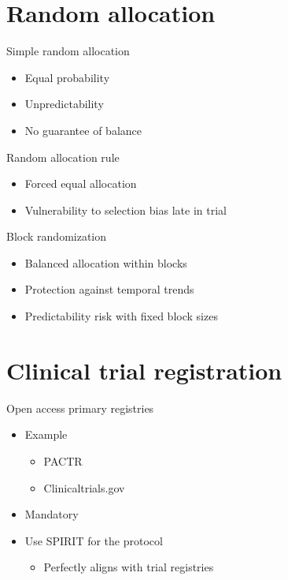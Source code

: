 \documentclass[
  14pt,
  ignorenonframetext,
  aspectratio=169,
]{beamer}
\providecommand{\tightlist}{%
  \setlength{\itemsep}{0pt}\setlength{\parskip}{0pt}}
\begin{document}
\section{Random allocation}\label{random-allocation}

\begin{frame}{Simple random allocation}
\protect{}\label{simple-random-allocation}
\begin{itemize}
\item
  Equal probability
\item
  Unpredictability
\item
  No guarantee of balance
\end{itemize}
\end{frame}

\begin{frame}{Random allocation rule}
\protect{}\label{random-allocation-rule}
\begin{itemize}
\item
  Forced equal allocation
\item
  Vulnerability to selection bias late in trial
\end{itemize}
\end{frame}

\begin{frame}{Block randomization}
\protect{}\label{block-randomization}
\begin{itemize}
\item
  Balanced allocation within blocks
\item
  Protection against temporal trends
\item
  Predictability risk with fixed block sizes
\end{itemize}
\end{frame}

\section{Clinical trial registration}\label{clinical-trial-registration}

\begin{frame}{Open access primary registries}
\protect{}\label{open-access-primary-registries}
\begin{itemize}
\item
  Example

  \begin{itemize}
  \item
    PACTR
  \item
    Clinicaltrials.gov
  \end{itemize}
\item
  Mandatory
\item
  Use SPIRIT for the protocol

  \begin{itemize}
  \tightlist
  \item
    Perfectly aligns with trial registries
  \end{itemize}
\end{itemize}
\end{frame}
\end{document}
